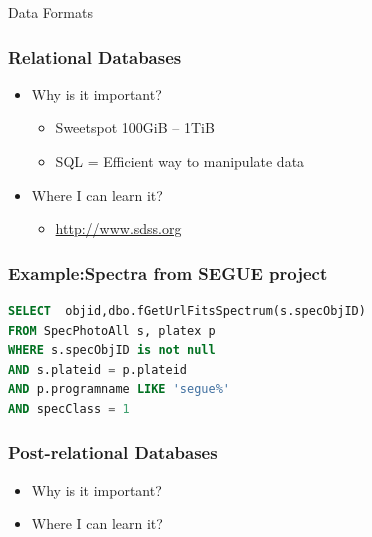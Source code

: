 \documentclass[fleqn]{beamer}
\begin{document}
\begin{section}{Data Formats}
  \begin{frame}\frametitle{Relational Databases}
  \begin{itemize}
    \item{Why is it important?}
      \begin{itemize}
      \item Sweetspot 100GiB -- 1TiB
      \item SQL = Efficient way to manipulate data
      \end{itemize}
    \item{Where I can learn it?}
      \begin{itemize}
      \item \url{http://www.sdss.org}
      \end{itemize}
  \end{itemize}
  \end{frame}

\begin{frame}[containsverbatim]\frametitle{Example:Spectra from SEGUE project }
\begin{lstlisting}[language=SQL]
SELECT  objid,dbo.fGetUrlFitsSpectrum(s.specObjID)                                                           
FROM SpecPhotoAll s, platex p                                                                         
WHERE s.specObjID is not null                                                                         
AND s.plateid = p.plateid                                                                             
AND p.programname LIKE 'segue%'                                                                       
AND specClass = 1
\end{lstlisting}
\end{frame}



  \begin{frame}\frametitle{Post-relational Databases}
  \begin{itemize}
    \item{Why is it important?}
    \item{Where I can learn it?}
  \end{itemize}

  \end{frame}
\end{section}

\end{document}
